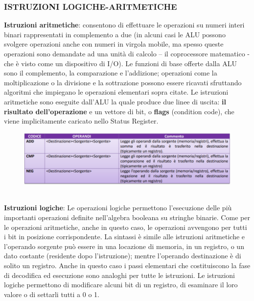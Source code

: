 \documentclass[12pt]{article}
\begin{document}
\subsubsection{ISTRUZIONI LOGICHE-ARITMETICHE}
\textbf{Istruzioni aritmetiche}:  consentono di effettuare le operazioni su numeri interi binari rappresentati in complemento a due (in alcuni casi le ALU possono svolgere operazioni anche con numeri in virgola mobile, ma spesso queste operazioni sono demandate ad una unità di calcolo – il coprocessore matematico - che è visto come un dispositivo di I/O). Le funzioni di base offerte dalla ALU sono il complemento, la comparazione e l’addizione; operazioni come la moltiplicazione o la divisione e la sottrazione possono essere ricavati sfruttando algoritmi che impiegano le operazioni elementari sopra citate. Le istruzioni aritmetiche sono eseguite dall’ALU la quale produce due linee di uscita: \textbf{il risultato dell’operazione} e un vettore di bit, o \textbf{flags} (condition code), che viene implicitamente caricato nello Status Register.
\begin{figure}[h]
    \centering
    \includegraphics[width=1\linewidth]{operazioni logico aritmetiche.png}
\end{figure}
\par\maketitle\noindent \\ 
\textbf{Istruzioni logiche}: Le operazioni logiche permettono l’esecuzione delle più importanti operazioni definite nell’algebra booleana su stringhe binarie. Come per le operazioni aritmetiche, anche in questo caso, le operazioni avvengono per tutti i bit in posizione corrispondente. La sintassi è simile alle istruzioni aritmetiche e l’operando sorgente può essere in una locazione di memoria, in un registro, o un dato costante (residente dopo l’istruzione); mentre l’operando destinazione è di solito un registro. Anche in questo caso i passi elementari che costituiscono la fase di decodifica ed esecuzione sono analoghi per tutte le istruzioni. Le istruzioni logiche permettono di modificare alcuni bit di un registro, di esaminare il loro valore o di settarli tutti a 0 o 1.
\end{document}
